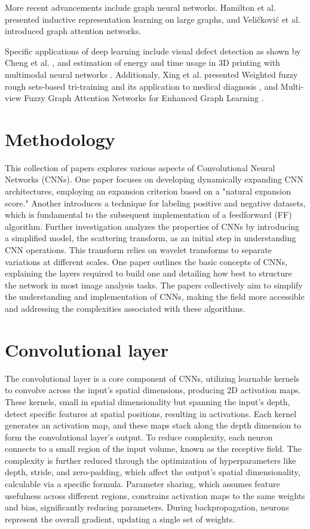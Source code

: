 \documentclass{article}
\begin{document}
More recent advancements include graph neural networks. Hamilton et al. \cite{15} presented inductive representation learning on large graphs, and Veličković et al. \cite{34} introduced graph attention networks.

Specific applications of deep learning include visual defect detection as shown by Cheng et al. \cite{4}, and estimation of energy and time usage in 3D printing with multimodal neural networks \cite{5}. Additionaly, Xing et al. presented Weighted fuzzy rough sets-based tri-training and its application to medical diagnosis \cite{35}, and Multi-view Fuzzy Graph Attention Networks for Enhanced Graph Learning \cite{36}.


\section*{Methodology}
This collection of papers explores various aspects of Convolutional Neural Networks (CNNs). One paper focuses on developing dynamically expanding CNN architectures, employing an expansion criterion based on a "natural expansion score." Another introduces a technique for labeling positive and negative datasets, which is fundamental to the subsequent implementation of a feedforward (FF) algorithm. Further investigation analyzes the properties of CNNs by introducing a simplified model, the scattering transform, as an initial step in understanding CNN operations. This transform relies on wavelet transforms to separate variations at different scales. One paper outlines the basic concepts of CNNs, explaining the layers required to build one and detailing how best to structure the network in most image analysis tasks. The papers collectively aim to simplify the understanding and implementation of CNNs, making the field more accessible and addressing the complexities associated with these algorithms.


\section*{Convolutional layer}

The convolutional layer is a core component of CNNs, utilizing learnable kernels to convolve across the input's spatial dimensions, producing 2D activation maps. These kernels, small in spatial dimensionality but spanning the input's depth, detect specific features at spatial positions, resulting in activations. Each kernel generates an activation map, and these maps stack along the depth dimension to form the convolutional layer's output. To reduce complexity, each neuron connects to a small region of the input volume, known as the receptive field. The complexity is further reduced through the optimization of hyperparameters like depth, stride, and zero-padding, which affect the output's spatial dimensionality, calculable via a specific formula. Parameter sharing, which assumes feature usefulness across different regions, constrains activation maps to the same weights and bias, significantly reducing parameters. During backpropagation, neurons represent the overall gradient, updating a single set of weights.
\end{document}

